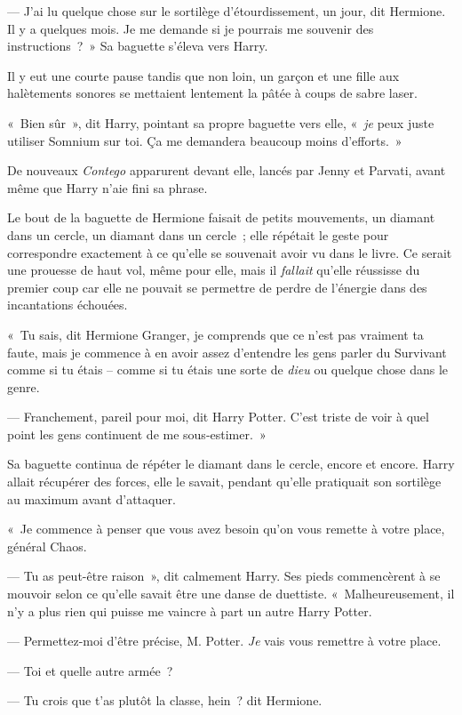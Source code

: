 --- J'ai lu quelque chose sur le sortilège d'étourdissement, un jour, dit Hermione.
Il y a quelques mois.
Je me demande si je pourrais me souvenir des instructions~?~»
Sa baguette s'éleva vers Harry.

Il y eut une courte pause tandis que non loin, un garçon et une fille aux halètements sonores se mettaient lentement la pâtée à coups de sabre laser.

«~Bien sûr~», dit Harry, pointant sa propre baguette vers elle, «~\emph{je} peux juste utiliser Somnium sur toi.
Ça me demandera beaucoup moins d'efforts.~»

De nouveaux \emph{Contego} apparurent devant elle, lancés par Jenny et Parvati, avant même que Harry n'aie fini sa phrase.

Le bout de la baguette de Hermione faisait de petits mouvements, un diamant dans un cercle, un diamant dans un cercle~; elle répétait le geste pour correspondre exactement à ce qu'elle se souvenait avoir vu dans le livre.
Ce serait une prouesse de haut vol, même pour elle, mais il \emph{fallait} qu'elle réussisse du premier coup car elle ne pouvait se permettre de perdre de l'énergie dans des incantations échouées.

«~Tu sais, dit Hermione Granger, je comprends que ce n'est pas vraiment ta faute, mais je commence à en avoir assez d'entendre les gens parler du Survivant comme si tu étais -- comme si tu étais une sorte de \emph{dieu} ou quelque chose dans le genre.

--- Franchement, pareil pour moi, dit Harry Potter.
C'est triste de voir à quel point les gens continuent de me sous-estimer.~»

Sa baguette continua de répéter le diamant dans le cercle, encore et encore.
Harry allait récupérer des forces, elle le savait, pendant qu'elle pratiquait son sortilège au maximum avant d'attaquer.

«~Je commence à penser que vous avez besoin qu'on vous remette à votre place, général Chaos.

--- Tu as peut-être raison~», dit calmement Harry.
Ses pieds commencèrent à se mouvoir selon ce qu'elle savait être une danse de duettiste.
«~Malheureusement, il n'y a plus rien qui puisse me vaincre à part un autre Harry Potter.

--- Permettez-moi d'être précise, M. Potter.
\emph{Je} vais vous remettre à votre place.

--- Toi et quelle autre armée~?

--- Tu crois que t'as plutôt la classe, hein~? dit Hermione.

